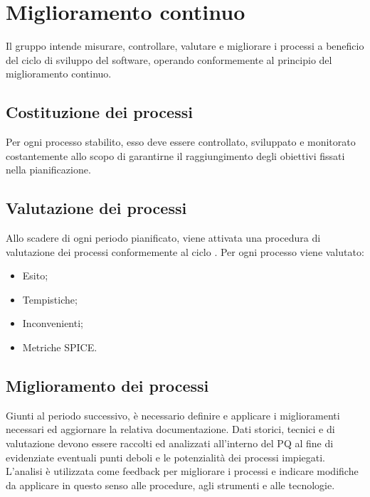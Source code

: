 \documentclass[../NormediProgetto.tex]{subfiles}
\begin{document}
	\section{Miglioramento continuo}
	Il gruppo intende misurare, controllare, valutare e migliorare i processi a beneficio del ciclo di sviluppo del software, operando conformemente al principio del miglioramento continuo.
	
	\subsection{Costituzione dei processi}
	Per ogni processo stabilito, esso deve essere controllato, sviluppato e monitorato costantemente allo scopo di
	garantirne il raggiungimento degli obiettivi fissati nella pianificazione.
	
	\subsection{Valutazione dei processi}
	Allo scadere di ogni periodo pianificato, viene attivata una procedura di valutazione dei processi conformemente al ciclo . Per ogni processo viene valutato:
	\begin{itemize}
		\item Esito;
		\item Tempistiche;
		\item Inconvenienti;
		\item Metriche SPICE.
	\end{itemize}
	
	\subsection{Miglioramento dei processi}
	Giunti al periodo successivo, è necessario definire e applicare i miglioramenti necessari ed aggiornare la relativa documentazione.
	Dati storici, tecnici e di valutazione devono essere raccolti ed analizzati all'interno del PQ al fine di evidenziate eventuali punti deboli e le potenzialità dei processi impiegati. L'analisi
	è utilizzata come feedback per migliorare i processi e indicare modifiche da applicare in questo senso alle procedure, agli strumenti e alle tecnologie.
	
\end{document}
